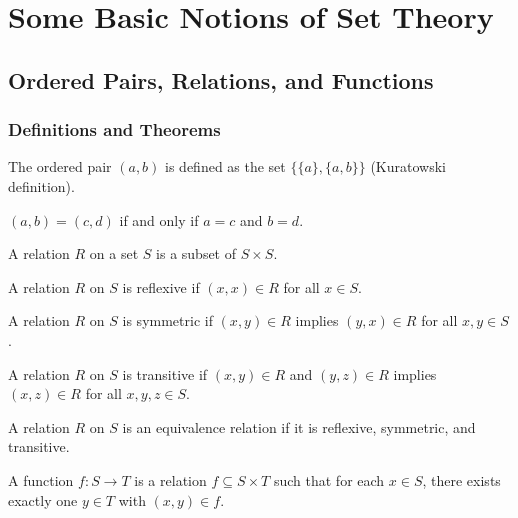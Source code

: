 \chapter{Some Basic Notions of Set Theory}

\section{Ordered Pairs, Relations, and Functions}

\subsection*{Definitions and Theorems}

\begin{definition}
The ordered pair $(a,b)$ is defined as the set $\{\{a\}, \{a,b\}\}$ (Kuratowski definition).
\end{definition}

\begin{theorem}
$(a,b) = (c,d)$ if and only if $a=c$ and $b=d$.
\end{theorem}

\begin{definition}[Relation]
A relation $R$ on a set $S$ is a subset of $S \times S$.
\end{definition}

\begin{definition}
A relation $R$ on $S$ is reflexive if $(x,x) \in R$ for all $x \in S$.
\end{definition}

\begin{definition}
A relation $R$ on $S$ is symmetric if $(x,y) \in R$ implies $(y,x) \in R$ for all $x,y \in S$.
\end{definition}

\begin{definition}
A relation $R$ on $S$ is transitive if $(x,y) \in R$ and $(y,z) \in R$ implies $(x,z) \in R$ for all $x,y,z \in S$.
\end{definition}

\begin{definition}
A relation $R$ on $S$ is an equivalence relation if it is reflexive, symmetric, and transitive.
\end{definition}

\begin{definition}[Function]
A function $f: S \to T$ is a relation $f \subseteq S \times T$ such that for each $x \in S$, there exists exactly one $y \in T$ with $(x,y) \in f$.
\end{definition}

